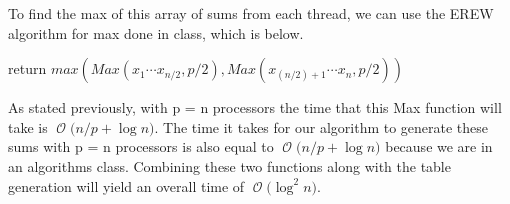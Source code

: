 \documentclass[12pt]{article}
\newcommand{\BigO}[1]{\ensuremath{\operatorname{\mathcal{O}}\bigl(#1\bigr)}}
\begin{document}
To find the max of this array of sums from each thread, we can use the EREW algorithm for max done in class, which is below.\\
\begin{algorithm}[H]
return {$max (Max(x_1 \cdots x_{n/2}, p/2), Max(x_{(n/2) +1} \cdots x_n, p/2))$}
\end{algorithm}
As stated previously, with p = n processors the time that this Max function will take is \BigO {n/p + \log n}. The time it takes for our algorithm to generate these sums with p = n processors is also equal to \BigO {n/p + \log n} because we are in an algorithms class. Combining these two functions along with the table generation will yield an overall time of \BigO {\log^2 n}.
\end{document}
